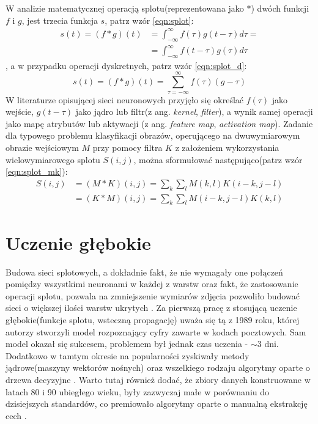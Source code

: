 W analizie matematycznej operacją splotu(reprezentowana jako $*$) dwóch funkcji $f$ i $g$, jest trzecia funkcja $s$, patrz wzór \ref{eqn:splot}:
\begin{equation}
	\begin{split}
		s(t) = (f * g)(t) & = \int_{-\infty}^{\infty}f(\tau)g(t-\tau)d\tau =\\
						  & =\int_{-\infty}^{\infty}f(t-\tau)g(\tau)d\tau
	\end{split}
	\label{eqn:splot}
\end{equation}
, a w przypadku operacji dyskretnych, patrz wzór \ref{eqn:splot_d}:
\begin{equation}
	s(t)=(f*g)(t)=\sum_{\tau = -\infty}^{\infty}f(\tau)(g-\tau)
	\label{eqn:splot_d}
\end{equation}
W literaturze opisującej sieci neuronowych przyjęło się określać $f(\tau)$ jako wejście, $g(t - \tau)$ jako jądro lub filtr(z ang. \textit{kernel}, \textit{filter}), a wynik samej operacji jako mapę atrybutów lub aktywacji (z ang. \textit{feature map}, \textit{activation map})\cite{piczak}. Zadanie dla typowego problemu klasyfikacji obrazów, operującego na dwuwymiarowym obrazie wejściowym $M$ przy pomocy filtra $K$ z założeniem wykorzystania wielowymiarowego splotu $S(i, j)$, można sformułować następująco(patrz wzór \ref{eqn:splot_mk}):
\begin{equation}
	\begin{split}
	S(i, j) & = (M*K)(i,j)=\sum_{k}^{}\sum_{l}^{}M(k,l)K(i-k,j-l) \\
		    & = (K*M)(i,j)=\sum_{k}^{}\sum_{l}^{}M(i-k,j-l)K(k,l)
	\end{split}
	\label{eqn:splot_mk}
\end{equation}

\section{Uczenie głębokie}

Budowa sieci splotowych, a dokładnie fakt, że nie wymagały one połączeń pomiędzy wszystkimi neuronami w każdej z warstw oraz fakt, że zastosowanie operacji splotu, pozwala na zmniejszenie wymiarów zdjęcia pozwoliło budować sieci o większej ilości warstw ukrytych \cite{python_ml}. Za pierwszą pracę z stosującą uczenie głębokie(funkcje splotu, wsteczną propagację) uważa się tą z 1989 roku, której autorzy stworzyli model rozpoznający cyfry zawarte w kodach pocztowych\cite{lecun}. Sam model okazał się sukcesem, problemem był jednak czas uczenia - $\sim$3 dni. Dodatkowo w tamtym okresie na popularności zyskiwały metody jądrowe(maszyny wektorów nośnych) oraz wszelkiego rodzaju algorytmy oparte o drzewa decyzyjne \cite{hands_on}. Warto tutaj również dodać, że zbiory danych konstruowane w latach 80 i 90 ubiegłego wieku, były zazwyczaj małe w porównaniu do dzisiejszych standardów, co premiowało algorytmy oparte o manualną ekstrakcję cech \cite{deep}. \\

